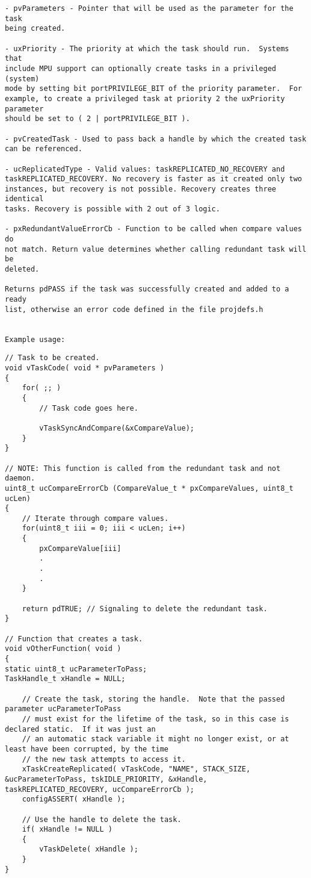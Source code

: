 \begin{lstlisting}
- pvParameters - Pointer that will be used as the parameter for the task
being created.

- uxPriority - The priority at which the task should run.  Systems that
include MPU support can optionally create tasks in a privileged (system)
mode by setting bit portPRIVILEGE_BIT of the priority parameter.  For
example, to create a privileged task at priority 2 the uxPriority parameter
should be set to ( 2 | portPRIVILEGE_BIT ).

- pvCreatedTask - Used to pass back a handle by which the created task
can be referenced.

- ucReplicatedType - Valid values: taskREPLICATED_NO_RECOVERY and
taskREPLICATED_RECOVERY. No recovery is faster as it created only two
instances, but recovery is not possible. Recovery creates three identical
tasks. Recovery is possible with 2 out of 3 logic.

- pxRedundantValueErrorCb - Function to be called when compare values do
not match. Return value determines whether calling redundant task will be
deleted.

Returns pdPASS if the task was successfully created and added to a ready
list, otherwise an error code defined in the file projdefs.h


Example usage:
\end{lstlisting}
\begin{verbatim}
// Task to be created.
void vTaskCode( void * pvParameters )
{
    for( ;; )
    {
        // Task code goes here.

        vTaskSyncAndCompare(&xCompareValue);
    }
}

// NOTE: This function is called from the redundant task and not daemon.
uint8_t ucCompareErrorCb (CompareValue_t * pxCompareValues, uint8_t ucLen)
{
    // Iterate through compare values.
    for(uint8_t iii = 0; iii < ucLen; i++)
    {
        pxCompareValue[iii]
        .
        .
        .
    }

    return pdTRUE; // Signaling to delete the redundant task.
}

// Function that creates a task.
void vOtherFunction( void )
{
static uint8_t ucParameterToPass;
TaskHandle_t xHandle = NULL;

    // Create the task, storing the handle.  Note that the passed parameter ucParameterToPass
    // must exist for the lifetime of the task, so in this case is declared static.  If it was just an
    // an automatic stack variable it might no longer exist, or at least have been corrupted, by the time
    // the new task attempts to access it.
    xTaskCreateReplicated( vTaskCode, "NAME", STACK_SIZE, &ucParameterToPass, tskIDLE_PRIORITY, &xHandle, taskREPLICATED_RECOVERY, ucCompareErrorCb );
    configASSERT( xHandle );

    // Use the handle to delete the task.
    if( xHandle != NULL )
    {
        vTaskDelete( xHandle );
    }
}

\end{verbatim}

